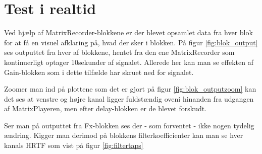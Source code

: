 \section{Test i realtid}

Ved hjælp af MatrixRecorder-blokkene er der blevet opsamlet data fra hver blok for at få en visuel afklaring på, hvad der sker i blokken. På figur \ref{fig:blok_output} ses outputtet fra hver af blokkene, hentet fra den ene MatrixRecorder som kontinuerligt optager 10sekunder af signalet. Allerede her kan man se effekten af Gain-blokken som i dette tilfælde har skruet ned for signalet.

 
Zoomer man ind på plottene som det er gjort på figur \ref{fig:blok_outputzoom} kan det ses at venstre og højre kanal ligger fuldstændig oveni hinanden fra udgangen af MatrixPlayeren, men efter delay-blokken er de blevet forskudt. 

Ser man på outputtet fra Fx-blokken ses der - som forventet - ikke nogen tydelig ændring. Kigger man derimod på blokkens filterkoefficienter kan man se hver kanals HRTF som vist på figur \ref{fig:filtertaps}


